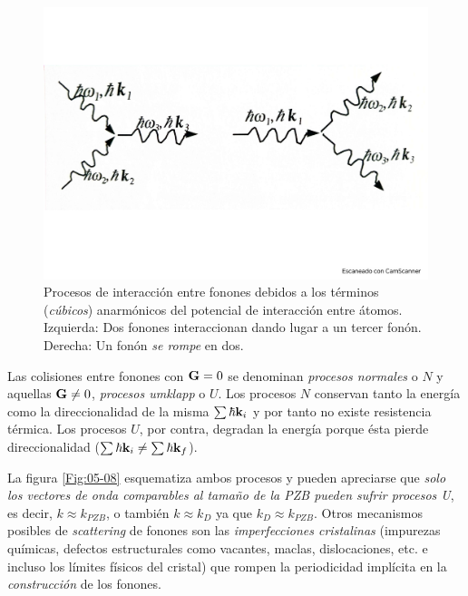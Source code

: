 \begin{figure}[h!] \centering
    \includegraphics[scale=0.3]{Cuerpo/Ch_05/Fotos libro 7.pdf}
    \caption{Procesos de interacción entre fonones debidos a los términos (\textit{cúbicos}) anarmónicos del potencial de interacción entre átomos. Izquierda: Dos fonones interaccionan dando lugar a un tercer fonón. Derecha: Un fonón \textit{se rompe} en dos.}
    \label{Fig:05-07}
\end{figure}    

Las colisiones entre fonones con $\mathbf{G}=0$ se denominan \textit{procesos normales} o $N$ y aquellas $\mathbf{G}\neq 0$, \textit{procesos umklapp} o $U$. Los procesos $N$ conservan tanto la energía como la direccionalidad de la misma $\sum \hbar \mathbf{k}_i$ y por tanto no existe resistencia térmica. Los procesos $U$, por contra, degradan la energía porque ésta pierde direccionalidad ($\sum\hbar \mathbf{k}_i\neq \sum\hbar \mathbf{k}_f$). 

La figura \ref{Fig:05-08} esquematiza ambos procesos y pueden apreciarse que \textit{solo los vectores de onda comparables al tamaño de la PZB pueden sufrir procesos U}, es decir, $k\approx k_{PZB}$, o también $k\approx k_D$ ya que $k_D \approx k_{PZB}$. Otros mecanismos posibles de \textit{scattering} de fonones son las \textit{imperfecciones cristalinas} (impurezas químicas, defectos estructurales como vacantes, maclas, dislocaciones, etc. e incluso los límites físicos del cristal) que rompen la periodicidad implícita en la \textit{construcción} de los fonones.

